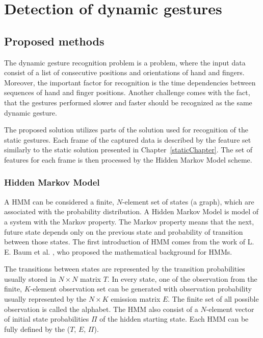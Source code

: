 \chapter{Detection of dynamic gestures}\label{dynamicChapter}

\section{Proposed methods}

The dynamic gesture recognition problem is a problem, where the input data consist of a list of consecutive positions and orientations of hand and fingers. 
Moreover, the important factor for recognition is the time dependencies between sequences of hand and finger positions.
Another challenge comes with the fact, that the gestures performed slower and faster should be recognized as the same dynamic gesture.

The proposed solution utilizes parts of the solution used for recognition of the static gestures.
Each frame of the captured data is described by the feature set similarly to the static solution presented in Chapter~\ref{staticChapter}.
The set of features for each frame is then processed by the Hidden Markov Model scheme. 

\subsection{Hidden Markov Model}

A HMM can be considered a finite, $N$-element set of states (a graph), which are associated with the probability distribution.
A Hidden Markov Model is model of a system with the Markov property.
The Markov property means that the next, future state depends only on the previous state and probability of transition between those states.
The first introduction of HMM comes from the work of L. E. Baum et al. \cite{hmmfirst}, who proposed the mathematical background for HMMs.

The transitions between states are represented by the transition probabilities usually stored in $N \times N$ matrix $T$.
In every state, one of the observation from the finite, $K$-element observation set can be generated with observation probability usually represented by the $N \times K$ emission matrix $E$.
The finite set of all possible observation is called the alphabet.
The HMM also consist of a $N$-element vector of initial state probabilities $\Pi$ of the hidden starting state.
Each HMM can be fully defined by the ($T$, $E$, $\Pi$).

